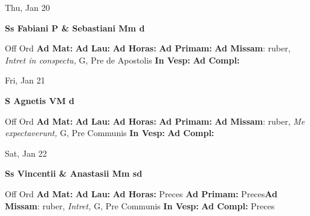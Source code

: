 \documentclass[10pt]{memoir}
\begin{document}
\begin{center}
\begin{minipage}{3.5in}
\vspace{2em}
\begin{center}Thu, Jan 20
\end{center}
\textbf{ \large Ss Fabiani P \& Sebastiani Mm
\textnormal{\normalsize d}}

\begin{justify}Off Ord
\textbf{Ad Mat: }
\textbf{Ad Lau: }
\textbf{Ad Horas: }
\textbf{Ad Primam: }\textbf{Ad Missam}: ruber, \textit{Intret in conspectu,} G, Pre de Apostolis
\textbf{In Vesp: }
\textbf{Ad Compl: }
\end{justify}
\end{minipage}
\end{center}

\begin{center}
\begin{minipage}{3.5in}
\vspace{2em}
\begin{center}Fri, Jan 21
\end{center}
\textbf{ \large S Agnetis VM
\textnormal{\normalsize d}}

\begin{justify}Off Ord
\textbf{Ad Mat: }
\textbf{Ad Lau: }
\textbf{Ad Horas: }
\textbf{Ad Primam: }\textbf{Ad Missam}: ruber, \textit{Me expectaverunt,} G, Pre Communis
\textbf{In Vesp: }
\textbf{Ad Compl: }
\end{justify}
\end{minipage}
\end{center}

\begin{center}
\begin{minipage}{3.5in}
\vspace{2em}
\begin{center}Sat, Jan 22
\end{center}
\textbf{ \large Ss Vincentii \& Anastasii Mm
\textnormal{\normalsize sd}}

\begin{justify}Off Ord
\textbf{Ad Mat: }
\textbf{Ad Lau: }
\textbf{Ad Horas: }Preces
\textbf{Ad Primam: }Preces\textbf{Ad Missam}: ruber, \textit{Intret,} G, Pre Communis
\textbf{In Vesp: }
\textbf{Ad Compl: }Preces
\end{justify}
\end{minipage}
\end{center}
\end{document}
